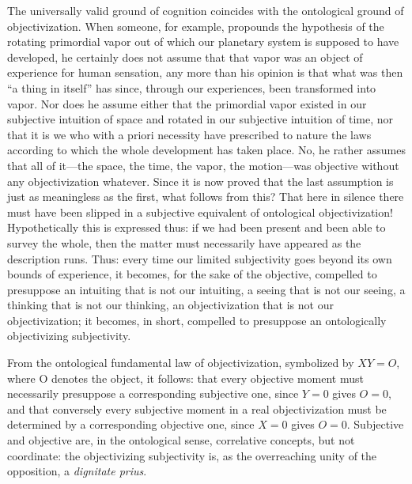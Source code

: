 \documentclass[12pt]{article}
\begin{document}
The universally valid ground of cognition coincides with the ontological
ground of objectivization. When someone, for example, propounds the
hypothesis of the rotating primordial vapor out of which our planetary
system is supposed to have developed, he certainly does not assume that
that vapor was an object of experience for human sensation, any more than
his opinion is that what was then ``a thing in itself'' has since, through
our experiences, been transformed into vapor. Nor does he assume either
that the primordial vapor
existed in our subjective intuition of space and rotated in our subjective
intuition of time, nor that it is we who with a priori necessity have
prescribed to nature the laws according to which the whole development has
taken place. No, he rather assumes that all of it—the space, the time, the
vapor, the motion—was objective without any objectivization whatever. Since
it is now proved that the last assumption is just as meaningless as the
first, what follows from this? That here in silence there must have been
slipped in a subjective equivalent of ontological objectivization!
Hypothetically this is expressed thus: if we had been present and been able
to survey the whole, then the matter must necessarily have appeared as the
description runs. Thus: every time our limited subjectivity goes beyond its
own bounds of experience, it becomes, for the sake of the objective,
compelled to presuppose an intuiting that is not our intuiting, a seeing
that is not our seeing, a thinking that is not our thinking, an
objectivization that is not our objectivization; it becomes, in short,
compelled to presuppose an ontologically objectivizing subjectivity.

From the ontological fundamental law of objectivization, symbolized by
$XY = O$, where O denotes the object, it follows: that every objective
moment must necessarily presuppose a corresponding subjective one, since
$Y = 0$ gives $O = 0$, and that conversely every subjective moment in a
real objectivization must be determined by a corresponding objective one,
since $X = 0$ gives $O = 0$. Subjective and objective are, in the
ontological sense, correlative concepts, but not coordinate: the
objectivizing subjectivity is, as the overreaching unity of the opposition,
a \textit{dignitate prius}.
\end{document}
